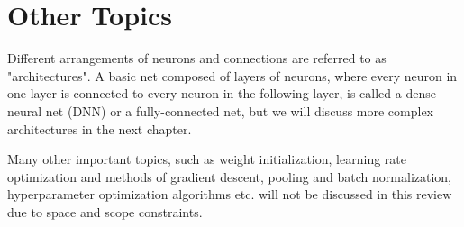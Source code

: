 \section{Other Topics}

Different arrangements of neurons and connections are referred to as "architectures". A basic net composed of layers of neurons, where every neuron in one layer is connected to every neuron in the following layer, is called a dense neural net (DNN) or a fully-connected net, but we will discuss more complex architectures in the next chapter.

Many other important topics, such as weight initialization, learning rate optimization and methods of gradient descent, pooling and batch normalization, hyperparameter optimization algorithms etc. will not be discussed in this review due to space and scope constraints.